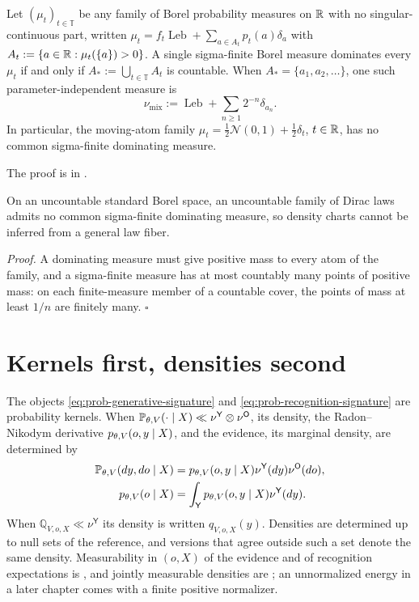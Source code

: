 Let $(\mu_t)_{t\in\mathbb T}$ be any family of Borel probability measures on $\mathbb R$ with no
singular-continuous part, written $\mu_t=f_t\operatorname{Leb}+\sum_{a\in A_t}p_t(a)\delta_a$ with
$A_t:=\{a\in\mathbb R:\mu_t(\{a\})>0\}$. A single sigma-finite Borel measure dominates every $\mu_t$ if and only
if $A_*:=\bigcup_{t\in\mathbb T}A_t$ is countable. When $A_*=\{a_1,a_2,\ldots\}$, one such
parameter-independent measure is
\begin{equation}
\nu_{\mathrm{mix}}:=\operatorname{Leb}+\sum_{n\geq1}2^{-n}\delta_{a_n}.
\label{eq:prob-mixed-family-reference}
\end{equation}
In particular, the moving-atom family $\mu_t=\tfrac12\mathcal N(0,1)+\tfrac12\delta_t$, $t\in\mathbb R$, has no
common sigma-finite dominating measure. 

The proof is in .

On an uncountable standard Borel space, an uncountable family of Dirac laws admits no common
sigma-finite dominating measure, so density charts cannot be inferred from a general law fiber.

\noindent\emph{Proof.}
A dominating measure must give positive mass to every atom of the family, and a sigma-finite measure
has at most countably many points of positive mass: on each finite-measure member of a countable cover,
the points of mass at least $1/n$ are finitely many. \hfill$\square$

\section{Kernels first, densities second}
\label{sec:prob-kernels}

The objects \eqref{eq:prob-generative-signature} and \eqref{eq:prob-recognition-signature} are
probability kernels. When $\mathbb P_{\theta,V}(\cdot\mid X)\ll\nu^{\mathsf Y}\otimes\nu^{\mathsf O}$,
its density, the Radon--Nikodym derivative $p_{\theta,V}(o,y\mid X)$, and the evidence, its marginal
density, are determined by
\begin{align}
\mathbb P_{\theta,V}(dy,do\mid X)&=p_{\theta,V}(o,y\mid X)\nu^{\mathsf Y}(dy)\nu^{\mathsf O}(do),
\label{eq:prob-generative-density}\\
p_{\theta,V}(o\mid X)&=\int_{\mathsf Y}p_{\theta,V}(o,y\mid X)\nu^{\mathsf Y}(dy).
\label{eq:prob-evidence}
\end{align}
When $\mathbb Q_{V,o,X}\ll\nu^{\mathsf Y}$ its density is written $q_{V,o,X}(y)$. Densities are determined
up to null sets of the reference, and versions that agree outside such a set denote the same density.
Measurability in $(o,X)$ of the evidence and of recognition expectations is
, and jointly measurable densities are
; an unnormalized energy in a later chapter comes with a finite
positive normalizer.

